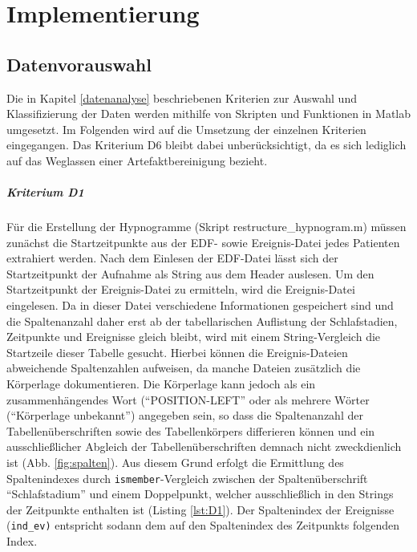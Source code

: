 \chapter{Implementierung}\label{Implementierung}

\section{Datenvorauswahl}\label{Datenvorauswahl}

Die in Kapitel \ref{datenanalyse} beschriebenen Kriterien zur Auswahl und Klassifizierung der Daten werden mithilfe von Skripten und Funktionen in Matlab umgesetzt. Im Folgenden wird auf die Umsetzung der einzelnen Kriterien eingegangen. Das Kriterium D6 bleibt dabei unberücksichtigt, da es sich lediglich auf das Weglassen einer Artefaktbereinigung bezieht.

\paragraph{Kriterium D1} Für die Erstellung der Hypnogramme (Skript restructure\_hypnogram.m) müssen zunächst die Startzeitpunkte aus der \acs{EDF}- sowie Ereignis-Datei jedes Patienten extrahiert werden. Nach dem Einlesen der EDF-Datei lässt sich der Startzeitpunkt der Aufnahme als String aus dem Header auslesen. Um den Startzeitpunkt der Ereignis-Datei zu ermitteln, wird die Ereignis-Datei eingelesen. Da in dieser Datei verschiedene Informationen gespeichert sind und die Spaltenanzahl daher erst ab der tabellarischen Auflistung der Schlafstadien, Zeitpunkte und Ereignisse gleich bleibt, wird mit einem String-Vergleich die Startzeile dieser Tabelle gesucht. Hierbei können die Ereignis-Dateien abweichende Spaltenzahlen aufweisen, da manche Dateien zusätzlich die Körperlage dokumentieren. Die Körperlage kann jedoch als ein zusammenhängendes Wort ("`POSITION-LEFT"' oder als mehrere Wörter ("`Körperlage unbekannt"') angegeben sein, so dass die Spaltenanzahl der Tabellenüberschriften sowie des Tabellenkörpers differieren können und ein ausschließlicher Abgleich der Tabellenüberschriften demnach nicht zweckdienlich ist (Abb. \ref{fig:spalten}). Aus diesem Grund erfolgt die Ermittlung des Spaltenindexes durch \texttt{ismember}-Vergleich zwischen der Spaltenüberschrift "`Schlafstadium"' und einem Doppelpunkt, welcher ausschließlich in den Strings der Zeitpunkte enthalten ist (Listing \ref{lst:D1}). Der Spaltenindex der Ereignisse (\texttt{ind\_ev)} entspricht sodann dem auf den Spaltenindex des Zeitpunkts folgenden Index.\\

